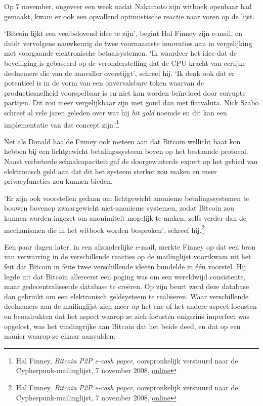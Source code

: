 \documentclass[
  a5paper,
  smalldemyvopaper,11pt,twoside,onecolumn,openright,extrafontsizes,
hidelinks]{memoir}
\begin{document}
Op 7 november, ongeveer een week nadat Nakamoto zijn witboek openbaar
had gemaakt, kwam er ook een opvallend optimistische reactie naar voren
op de lijst.

`Bitcoin lijkt een veelbelovend idee te zijn', begint Hal Finney zijn
e-mail, en duidt vervolgens nauwkeurig de twee voornaamste innovaties
aan in vergelijking met voorgaande elektronische betaalsystemen. `Ik
waardeer het idee dat de beveiliging is gebaseerd op de veronderstelling
dat de CPU-kracht van eerlijke deelnemers die van de aanvaller
overstijgt', schreef hij. `Ik denk ook dat er potentieel is in de vorm
van een onvervalsbare token waarvan de productiesnelheid voorspelbaar is
en niet kan worden beïnvloed door corrupte partijen. Dit zou meer
vergelijkbaar zijn met goud dan met fiatvaluta. Nick Szabo schreef al
vele jaren geleden over wat hij \emph{bit gold} noemde en dit kan een
implementatie van dat concept zijn.'\footnote{Hal Finney, \emph{Bitcoin
  P2P e-cash paper}, oorspronkelijk verstuurd naar de
  Cypherpunk-mailinglijst, 7 november 2008,
  \href{https://www.metzdowd.com/pipermail/cryptography/2008-November/014827.html}{online}}

Net als Donald haalde Finney ook meteen aan dat Bitcoin wellicht baat
kon hebben bij een lichtgewicht betalingssysteem boven op het bestaande
protocol. Naast verbeterde schaalcapaciteit gaf de doorgewinterde expert
op het gebied van elektronisch geld aan dat dit het systeem sterker zou
maken en meer privacyfuncties zou kunnen bieden.

`Er zijn ook voorstellen gedaan om lichtgewicht anonieme
betalingssystemen te bouwen bovenop zwaargewicht niet-anonieme systemen,
zodat Bitcoin zou kunnen worden ingezet om anonimiteit mogelijk te
maken, zelfs verder dan de mechanismen die in het witboek worden
besproken', schreef hij.\footnote{Hal Finney, \emph{Bitcoin P2P e-cash
  paper}, oorspronkelijk verstuurd naar de Cypherpunk-mailinglijst, 7
  november 2008,
  \href{https://www.metzdowd.com/pipermail/cryptography/2008-November/014827.html}{online}}

Een paar dagen later, in een afzonderlijke e-mail, merkte Finney op dat
een bron van verwarring in de verschillende reacties op de mailinglijst
voortkwam uit het feit dat Bitcoin in feite twee verschillende ideeën
bundelde in één voorstel. Hij legde uit dat Bitcoin allereerst een
poging was om een wereldwijd consistente, maar gedecentraliseerde
database te creëren. Op zijn beurt werd deze database dan gebruikt om
een elektronisch geldsysteem te realiseren. Waar verschillende
deelnemers aan de mailinglijst zich meer op het ene of het andere aspect
focusten en benadrukten dat het aspect waarop ze zich focusten enigszins
imperfect was opgelost, was het vindingrijke aan Bitcoin dat het beide
deed, en dat op een manier waarop ze elkaar aanvulden.
\end{document}
